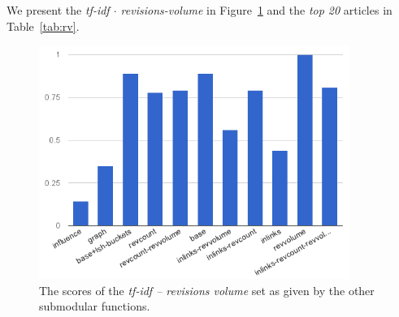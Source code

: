 We present the \emph{tf-idf \(\cdot\) revisions-volume} in Figure~\ref{img:rv}
and the \emph{top 20} articles in Table~\ref{tab:rv}.
\begin{figure}
  \centering
  \includegraphics[width=0.9\textwidth,natwidth=555,natheight=419]{images/rv.png}
  \caption{The scores of the \emph{tf-idf -- revisions volume} set as given by
  the other submodular functions.}
  \label{img:rv}
\end{figure}

